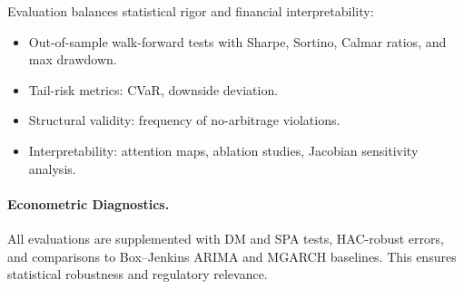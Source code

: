 \documentclass[10pt,twocolumn]{article}
\begin{document}
Evaluation balances statistical rigor and financial interpretability:  

\begin{itemize}
    \item Out-of-sample walk-forward tests with Sharpe, Sortino, Calmar ratios, and max drawdown.  
    \item Tail-risk metrics: CVaR, downside deviation.  
    \item Structural validity: frequency of no-arbitrage violations.  
    \item Interpretability: attention maps, ablation studies, Jacobian sensitivity analysis.  
\end{itemize}

\paragraph{Econometric Diagnostics.}
All evaluations are supplemented with DM and SPA tests, HAC-robust errors, and comparisons to Box–Jenkins ARIMA and MGARCH baselines. This ensures statistical robustness and regulatory relevance.  
\end{document}
